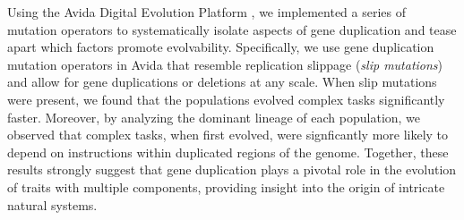 Using the Avida Digital Evolution Platform \citep{ofria2004avida}, we implemented a series of mutation operators to systematically isolate aspects of gene duplication and tease apart which factors promote evolvability.
Specifically, we use gene duplication mutation operators in Avida that resemble replication slippage \citep{bzymek_instability_2001} (\textit{slip mutations}) and allow for gene duplications or deletions at any scale.
When slip mutations were present, we found that the populations evolved complex tasks significantly faster.
Moreover, by analyzing the dominant lineage of each population, we observed that complex tasks, when first evolved, were signficantly more likely to depend on instructions within duplicated regions of the genome.
Together, these results strongly suggest that gene duplication plays a pivotal role in the evolution of traits with multiple components, providing insight into the origin of intricate natural systems.



